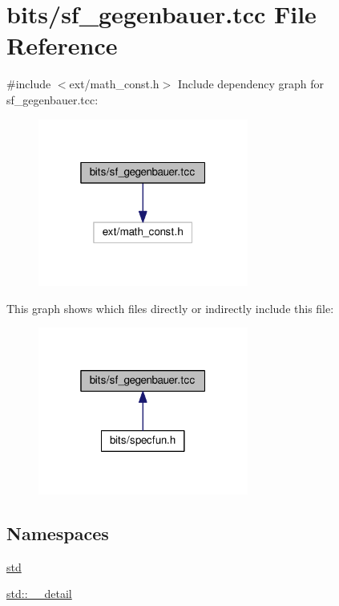 \hypertarget{sf__gegenbauer_8tcc}{}\section{bits/sf\+\_\+gegenbauer.tcc File Reference}
\label{sf__gegenbauer_8tcc}
{\ttfamily \#include $<$ext/math\+\_\+const.\+h$>$}\newline
Include dependency graph for sf\+\_\+gegenbauer.\+tcc\+:
\nopagebreak
\begin{figure}[H]
\begin{center}
\leavevmode
\includegraphics[width=196pt]{sf__gegenbauer_8tcc__incl}
\end{center}
\end{figure}
This graph shows which files directly or indirectly include this file\+:
\nopagebreak
\begin{figure}[H]
\begin{center}
\leavevmode
\includegraphics[width=196pt]{sf__gegenbauer_8tcc__dep__incl}
\end{center}
\end{figure}
\subsection*{Namespaces}
\begin{DoxyCompactItemize}
\item 
 \hyperlink{namespacestd}{std}
\item 
 \hyperlink{namespacestd_1_1____detail}{std\+::\+\_\+\+\_\+detail}
\end{DoxyCompactItemize}
